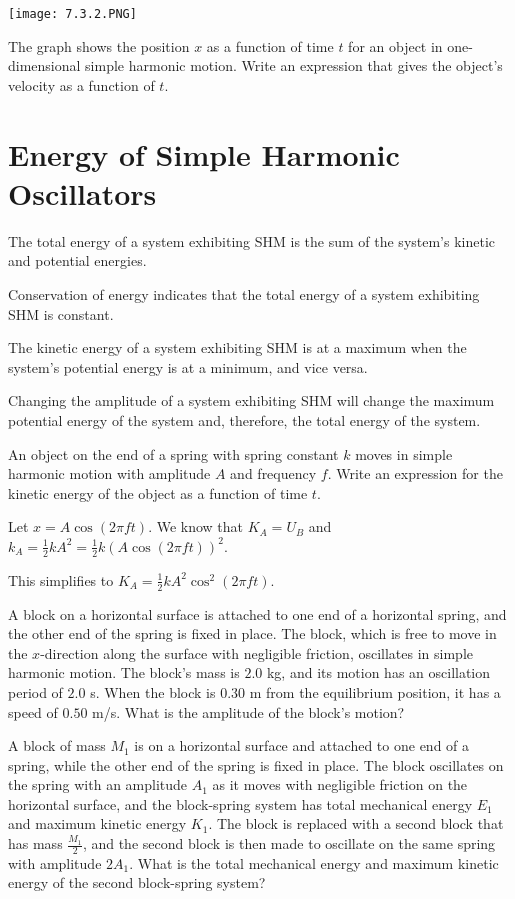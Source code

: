 \documentclass[../mech.tex]{subfiles}
\begin{document}
\ex 
\begin{center}
    \texttt{[image: 7.3.2.PNG]}
\end{center}
The graph shows the position $x$ as a function of time $t$ for an object in one-dimensional simple harmonic motion. Write an expression that gives the object's velocity as a function of $t$.

\section{Energy of Simple Harmonic Oscillators}
The total energy of a system exhibiting SHM is the sum of the system's kinetic and potential energies.

Conservation of energy indicates that the total energy of a system exhibiting SHM is constant.

The kinetic energy of a system exhibiting SHM is at a maximum when the system's potential energy is at a minimum, and vice versa.

Changing the amplitude of a system exhibiting SHM will change the maximum potential energy of the system and, therefore, the total energy of the system.

\begin{example}
    An object on the end of a spring with spring constant $k$ moves in simple harmonic motion with amplitude $A$ and frequency $f$. Write an expression for the kinetic energy of the object as a function of time $t$.

    Let $x=A\cos (2\pi ft)$. We know that $K_A=U_B$ and $k_A=\frac{1}{2}kA^2=\frac{1}{2}k(A\cos(2\pi ft))^2$.

    This simplifies to $K_A=\frac{1}{2}kA^2\cos^2 (2\pi ft)$.
\end{example}

\ex A block on a horizontal surface is attached to one end of a horizontal spring, and the other end of the spring is fixed in place. The block, which is free to move in the $x$-direction along the surface with negligible friction, oscillates in simple harmonic motion.
The block's mass is $2.0$ kg, and its motion has an oscillation period of $2.0$ s. When the block is $0.30$ m from the equilibrium position, it has a speed of $0.50$ m/s. What is the amplitude of the block's motion?

\ex A block of mass $M_1$ is on a horizontal surface and attached to one end of a spring, while the other end of the spring is fixed in place. The block oscillates on the spring with an amplitude $A_1$ as it moves with negligible friction 
on the horizontal surface, and the block-spring system has total mechanical energy $E_1$ and maximum kinetic energy $K_1$. The block is replaced with a second block that has mass $\frac{M_1}{2}$, and the second block 
is then made to oscillate on the same spring with amplitude $2A_1$. What is the total mechanical energy and maximum kinetic energy of the second block-spring system?
\end{document}
